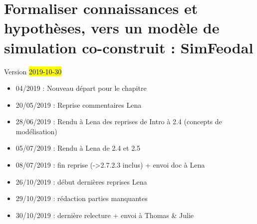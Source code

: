 \chapter{Formaliser connaissances et hypothèses, vers un modèle de simulation co-construit : SimFeodal}
\label{chap:chap2}
\begin{center}
	{\large Version \hl{2019-10-30}}
\end{center}

\begin{itemize}
	\item 04/2019 : Nouveau départ pour le chapitre
	\item 20/05/2019 : Reprise commentaires Lena
	\item 28/06/2019 : Rendu à Lena des reprises de Intro à 2.4 (concepts de modélisation)
	\item 05/07/2019 : Rendu à Lena de 2.4 et 2.5
	\item 08/07/2019 : fin reprise (->2.7.2.3 inclus) + envoi doc à Lena
	\item 26/10/2019 : début dernières reprises Lena
	\item 29/10/2019 : rédaction parties manquantes
	\item 30/10/2019 : dernière relecture + envoi à Thomas \& Julie
\end{itemize}
\setcounter{minitocdepth}{1}

\minitoc

%

\clearpage

